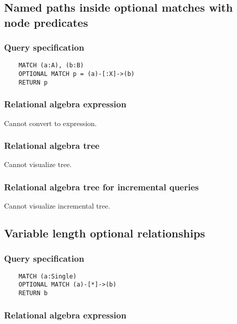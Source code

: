 	\subsection{Named paths inside optional matches with node predicates}

	\subsubsection*{Query specification}

	\begin{lstlisting}
	MATCH (a:A), (b:B)
	OPTIONAL MATCH p = (a)-[:X]->(b)
	RETURN p
	\end{lstlisting}


	\subsubsection*{Relational algebra expression}

	Cannot convert to expression.

	\subsubsection*{Relational algebra tree}

	Cannot visualize tree.

	\subsubsection*{Relational algebra tree for incremental queries}

	Cannot visualize incremental tree.
	\subsection{Variable length optional relationships}

	\subsubsection*{Query specification}

	\begin{lstlisting}
	MATCH (a:Single)
	OPTIONAL MATCH (a)-[*]->(b)
	RETURN b
	\end{lstlisting}


	\subsubsection*{Relational algebra expression}

